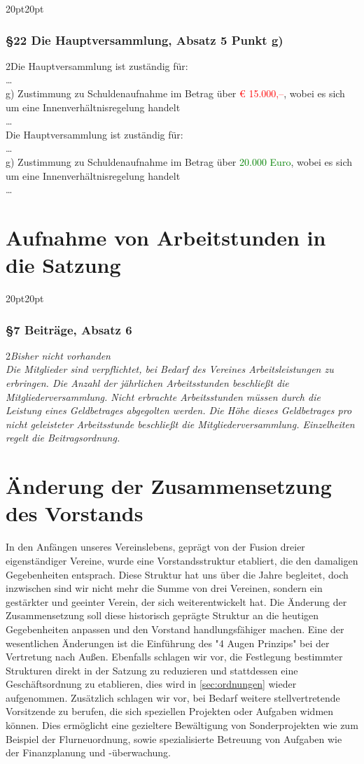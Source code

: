 \documentclass[10pt,a4paper,parskip=half]{scrartcl}
\newcommand{\new}[1]{\textcolor{Green}{#1}}
\newcommand{\old}[1]{\textcolor{Red}{#1}}
\newcommand{\change}[1]{
  \begin{adjustwidth}{20pt}{20pt}
    #1
  \end{adjustwidth}
}
\newcommand{\compare}[3]{\change{\subsubsection*{#1}\begin{multicols}{2}#2\columnbreak\\#3\end{multicols}}}
\begin{document}
\compare{§22 Die Hauptversammlung, Absatz 5 Punkt g)}
{Die Hauptversammlung ist zuständig für: \\ \dots\\g) Zustimmung zu Schuldenaufnahme im Betrag über \old{€ 15.000,--}, wobei es sich um eine Innenverhältnisregelung handelt\\\dots}
{Die Hauptversammlung ist zuständig für: \\ \dots\\g) Zustimmung zu Schuldenaufnahme im Betrag über \new{20.000 Euro}, wobei es sich um eine Innenverhältnisregelung handelt\\\dots}

\clearpage


\section {Aufnahme von Arbeitstunden in die Satzung}
\label{sec:arbeitsstunden}

\compare{§7 Beiträge, Absatz 6}{\em Bisher nicht vorhanden \em}{Die Mitglieder sind verpflichtet, bei Bedarf des Vereines Arbeitsleistungen zu erbringen.
Die Anzahl der jährlichen Arbeitsstunden beschließt die Mitgliederversammlung.
Nicht erbrachte Arbeitsstunden müssen durch die Leistung eines Geldbetrages abgegolten werden.
Die Höhe dieses Geldbetrages pro nicht geleisteter Arbeitsstunde beschließt die Mitgliederversammlung.
Einzelheiten regelt die Beitragsordnung.}

\section{Änderung der Zusammensetzung des Vorstands}
\label{sec:vorstand}
In den Anfängen unseres Vereinslebens, geprägt von der Fusion dreier eigenständiger Vereine, wurde eine Vorstandsstruktur etabliert, die den damaligen Gegebenheiten entsprach. Diese Struktur hat uns über die Jahre begleitet, doch inzwischen sind wir nicht mehr die Summe von drei Vereinen, sondern ein gestärkter und geeinter Verein, der sich weiterentwickelt hat.
Die Änderung der Zusammensetzung soll diese historisch geprägte Struktur an die heutigen Gegebenheiten anpassen und den Vorstand handlungsfähiger machen. Eine der wesentlichen Änderungen ist die Einführung des "4 Augen Prinzips" bei der Vertretung nach Außen. Ebenfalls schlagen wir vor, die Festlegung bestimmter Strukturen direkt in der Satzung zu reduzieren und stattdessen eine Geschäftsordnung zu etablieren, dies wird in \autoref{sec:ordnungen} wieder aufgenommen. Zusätzlich schlagen wir vor, bei Bedarf weitere stellvertretende Vorsitzende zu berufen, die sich speziellen Projekten oder Aufgaben widmen können. Dies ermöglicht eine gezieltere Bewältigung von Sonderprojekten wie zum Beispiel der Flurneuordnung, sowie spezialisierte Betreuung von Aufgaben wie der Finanzplanung und -überwachung.
\end{document}

